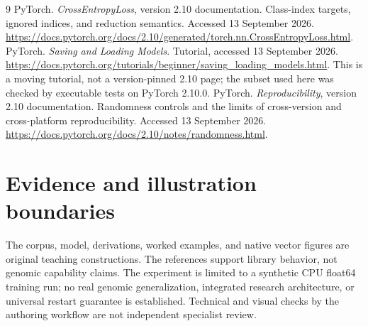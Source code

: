 \begin{thebibliography}{9}
 PyTorch. \emph{CrossEntropyLoss}, version 2.10 documentation. Class-index targets, ignored indices, and reduction semantics. Accessed 13 September 2026. \url{https://docs.pytorch.org/docs/2.10/generated/torch.nn.CrossEntropyLoss.html}.
 PyTorch. \emph{Saving and Loading Models}. Tutorial, accessed 13 September 2026. \url{https://docs.pytorch.org/tutorials/beginner/saving_loading_models.html}. This is a moving tutorial, not a version-pinned 2.10 page; the subset used here was checked by executable tests on PyTorch 2.10.0.
 PyTorch. \emph{Reproducibility}, version 2.10 documentation. Randomness controls and the limits of cross-version and cross-platform reproducibility. Accessed 13 September 2026. \url{https://docs.pytorch.org/docs/2.10/notes/randomness.html}.
\end{thebibliography}
\section*{Evidence and illustration boundaries}
The corpus, model, derivations, worked examples, and native vector figures are original teaching constructions. The references support library behavior, not genomic capability claims. The experiment is limited to a synthetic CPU float64 training run; no real genomic generalization, integrated research architecture, or universal restart guarantee is established. Technical and visual checks by the authoring workflow are not independent specialist review.

